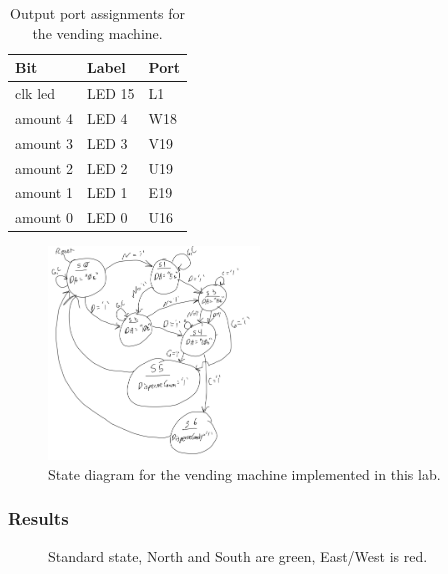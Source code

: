 \documentclass[11pt]{article}
\begin{document}
\begin{table}[H]
\begin{center}
\begin{tabular}{| l | l | l |}
	\hline
	Bit & Label & Port \\ \hline
	clk led & LED 15 & L1 \\ \hline
	amount 4 & LED 4 & W18 \\ \hline
	amount 3 & LED 3 & V19 \\ \hline
	amount 2 & LED 2 & U19 \\ \hline
	amount 1 & LED 1 & E19 \\ \hline
	amount 0 & LED 0 & U16 \\ \hline
\end{tabular}
\caption{\label{tab:lab10_output_Ports}Output port assignments for the vending machine.}
\end{center}
\end{table}

\begin{figure}
\begin{center}
	\includegraphics[width=0.5\textwidth]{./images/vendingMachineStateDiagram.png}
	\caption{\label{fig:lab10_state_diagram}State diagram for the vending machine implemented in this lab.}
\end{center}
\end{figure}

\subsubsection{Results}

\begin{figure}[H]
\begin{center}
	\caption{\label{fig:part1_img1}Standard state, North and South are green, East/West is red.}
\end{center}
\end{figure}
\end{document}
